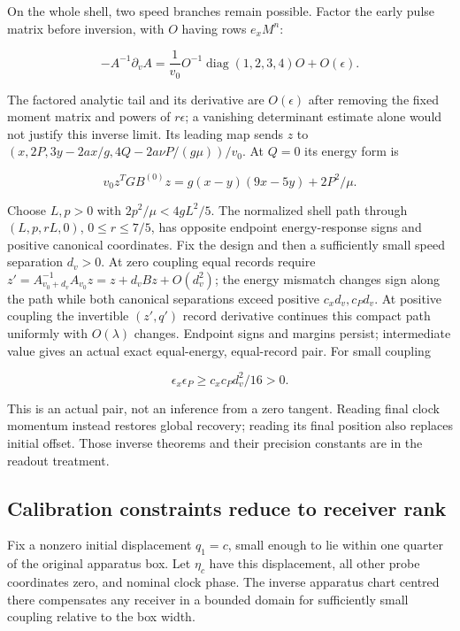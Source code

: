 \documentclass[11pt,a4paper]{article}
\begin{document}
On the whole shell, two speed branches remain possible. Factor the early
pulse matrix before inversion, with \(O\) having rows \(e_xM^n\):

\[-A^{-1}\partial_vA=\frac1{v_0}O^{-1}\operatorname{diag}(1,2,3,4)O
 +O(\epsilon).\]

The factored analytic tail and its derivative are \(O(\epsilon)\) after
removing the fixed moment matrix and powers of \(r\epsilon\); a
vanishing determinant estimate alone would not justify this inverse
limit. Its leading map sends \(z\) to
\((x,2P,3y-2ax/g,4Q-2a\nu P/(g\mu))/v_0\). At \(Q=0\) its energy form is

\[v_0z^TGB^{(0)}z=g(x-y)(9x-5y)+2P^2/\mu.\]

Choose \(L,p>0\) with \(2p^2/\mu<4gL^2/5\). The normalized shell path
through \((L,p,rL,0)\), \(0\le r\le7/5\), has opposite endpoint
energy-response signs and positive canonical coordinates. Fix the design
and then a sufficiently small speed separation \(d_v>0\). At zero
coupling equal records require
\(z'=A_{v_0+d_v}^{-1}A_{v_0}z=z+d_vBz+O(d_v^2)\); the energy mismatch
changes sign along the path while both canonical separations exceed
positive \(c_xd_v,c_Pd_v\). At positive coupling the invertible
\((z',q')\) record derivative continues this compact path uniformly with
\(O(\lambda)\) changes. Endpoint signs and margins persist; intermediate
value gives an actual exact equal-energy, equal-record pair. For small
coupling

\[\epsilon_x\epsilon_P\ge c_xc_Pd_v^2/16>0.\]

This is an actual pair, not an inference from a zero tangent. Reading
final clock momentum instead restores global recovery; reading its final
position also replaces initial offset. Those inverse theorems and their
precision constants are in the readout treatment.

\hypertarget{calibration-constraints-reduce-to-receiver-rank}{%
\subsection{Calibration constraints reduce to receiver
rank}\label{calibration-constraints-reduce-to-receiver-rank}}

Fix a nonzero initial displacement \(q_1=c\), small enough to lie within
one quarter of the original apparatus box. Let \(\eta_c\) have this
displacement, all other probe coordinates zero, and nominal clock phase.
The inverse apparatus chart centred there compensates any receiver in a
bounded domain for sufficiently small coupling relative to the box
width.
\end{document}
